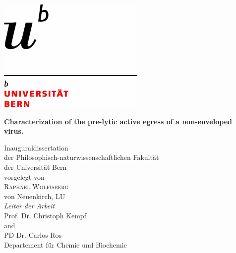 \documentclass[11pt, titlepage, a4paper, twoside, onecolumn, DIV=calc]{scrbook} %
\begin{document}



\captionsetup[table]{singlelinecheck=off} %




\begin{titlepage}
\begin{flushright}
\includegraphics[scale=0.3, trim= 1mm 1mm 5mm 20mm]{logo} \\[1.4 cm]
\end{flushright}
\begin{center}
\begin{spacing}{2.5}
{\Huge \bfseries Characterization of the pre-lytic active egress of a non-enveloped virus.} \\[1.7 cm]
\end{spacing}
{\Large Inauguraldissertation \\
der Philosophisch-naturwissenschaftlichen Fakultät \\
der Universität Bern \\[1.7cm]
{\large vorgelegt von}\\[0.3 cm]
{\LARGE \textsc{Raphael Wolfisberg}} \\[0.3 cm] 
{\large von Neuenkirch, LU} \\ [2 cm]
{\Large \emph{Leiter der Arbeit}\\ [0.3 cm]
{\textsc Prof. Dr. Christoph Kempf} \\
and \\
{\textsc PD Dr. Carlos Ros} \\ [0.9 cm]
Departement für Chemie und Biochemie}}
\end{center}
\end{titlepage}
\end{document}
